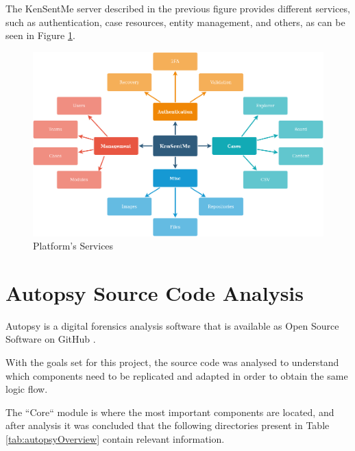 The KenSentMe server described in the previous figure provides different services, such as authentication, case resources, entity management, and others, as can be seen in Figure \ref{fig:services}.

\begin{figure}[ht]
 \centering
 \includegraphics[width=1\linewidth]{imgs/services.png}
 \caption{Platform's Services}
 \label{fig:services}
\end{figure}

\section{Autopsy Source Code Analysis}

Autopsy is a digital forensics analysis software that is available as Open Source Software \cite{opensource} on GitHub \cite{github}.

With the goals set for this project, the source code was analysed to understand which components need to be replicated and adapted in order to obtain the same logic flow.

The ``Core`` module is where the most important components are located, and after analysis it was concluded that the following directories present in Table \ref{tab:autopsyOverview} contain relevant information.


\pagebreak

